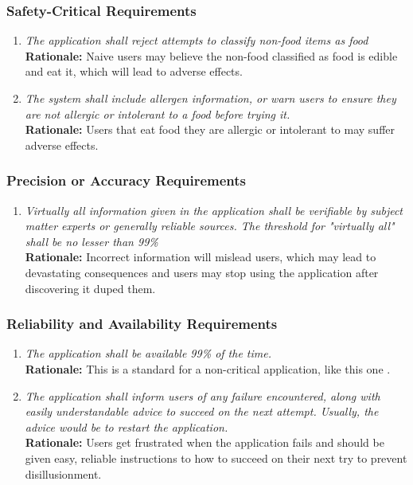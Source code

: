 \documentclass[]{article}
\begin{document}
\subsubsection{Safety-Critical Requirements}
\label{ssub:safety_critical_requirements}
\begin{enumerate}[{PR-SC}1. ]
	\item \textit{The application shall reject attempts to classify non-food items as food} \\ \textbf{Rationale:} Naive users may believe the non-food classified as food is edible and eat it, which will lead to adverse effects.
    \item \textit{The system shall include allergen information, or warn users to ensure they are not allergic or intolerant to a food before trying it.} \\ \textbf{Rationale:} Users that eat food they are allergic or intolerant to may suffer adverse effects.
\end{enumerate}

\subsubsection{Precision or Accuracy Requirements}
\label{ssub:precision_or_accuracy_requirements}
\begin{enumerate}[{PR-PA}1. ]
	\item \textit{Virtually all information given in the application shall be verifiable by subject matter experts or generally reliable sources. The threshold for "virtually all" shall be no lesser than 99\% } \\ \textbf{Rationale:} Incorrect information will mislead users, which may lead to devastating consequences and users may stop using the application after discovering it duped them.
\end{enumerate}

\subsubsection{Reliability and Availability Requirements}
\label{ssub:reliability_and_availability_requirements}
\begin{enumerate}[{PR-RA}1. ]
	\item \textit{The application shall be available 99\% of the time.} \\ \textbf{Rationale:} This is a standard for a non-critical application, like this one \cite{ConcreteCMS}.
    \item \textit{The application shall inform users of any failure encountered, along with easily understandable advice to succeed on the next attempt. Usually, the advice would be to restart the application.} \\ \textbf{Rationale:} Users get frustrated when the application fails and should be given easy, reliable instructions to how to succeed on their next try to prevent disillusionment.
\end{enumerate}
\end{document}

